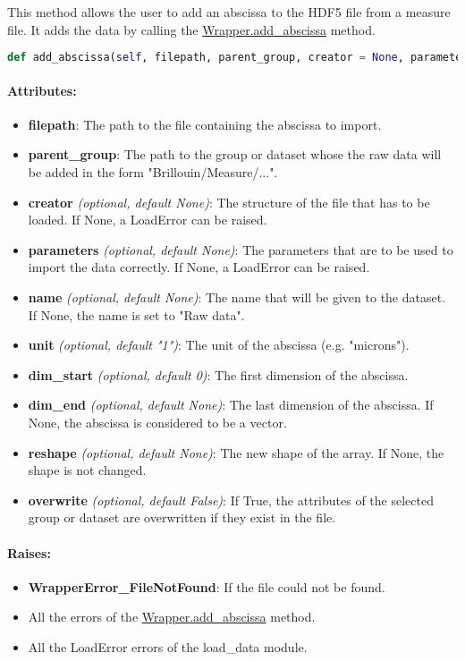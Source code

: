 This method allows the user to add an abscissa to the HDF5 file from a measure file. It adds the data by calling the \hyperref[subsec:wrapper.add_abscissa]{Wrapper.add\_abscissa} method.

\begin{lstlisting}[language=Python]
def add_abscissa(self, filepath, parent_group, creator = None, parameters = None, name=None, unit = "AU" , dim_start = 0, dim_end = None, reshape = None, overwrite = False):
\end{lstlisting}

\paragraph{Attributes:}

\begin{itemize}
    \item \textbf{filepath}: The path to the file containing the abscissa to import.
    \item \textbf{parent\_group}: The path to the group or dataset whose the raw data will be added in the form "Brillouin/Measure/...".
    \item \textbf{creator} \textit{(optional, default None)}: The structure of the file that has to be loaded. If None, a LoadError can be raised.
    \item \textbf{parameters} \textit{(optional, default None)}: The parameters that are to be used to import the data correctly.  If None, a LoadError can be raised.
    \item \textbf{name} \textit{(optional, default None)}: The name that will be given to the dataset. If None, the name is set to "Raw data".
    \item \textbf{unit} \textit{(optional, default "1")}: The unit of the abscissa (e.g. "microns").
    \item \textbf{dim\_start} \textit{(optional, default 0)}: The first dimension of the abscissa.
    \item \textbf{dim\_end} \textit{(optional, default None)}: The last dimension of the abscissa. If None, the abscissa is considered to be a vector.
    \item \textbf{reshape} \textit{(optional, default None)}: The new shape of the array. If None, the shape is not changed.
    \item \textbf{overwrite} \textit{(optional, default False)}: If True, the attributes of the selected group or dataset are overwritten if they exist in the file.
\end{itemize}

\paragraph{Raises:}
\begin{itemize}
    \item \textbf{WrapperError\_FileNotFound}: If the file could not be found.  
    \item All the errors of the \hyperref[subsec:wrapper.add_abscissa]{Wrapper.add\_abscissa} method.
    \item All the LoadError errors of the load\_data module.
\end{itemize}
